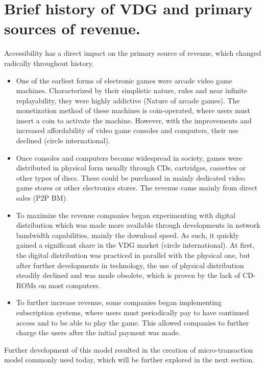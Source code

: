 \documentclass[10pt,british,a4paper,titlepage]{article}
\begin{document}
\section{Brief history of VDG and primary sources of revenue.}

Accessibility has a direct impact on the primary source of revenue, which changed radically throughout history.
 
\begin{itemize}

\item One of the earliest forms of electronic games were arcade video game machines. Characterized by their simplistic nature, rules and near infinite replayability, they were highly addictive (Nature of arcade games). The monetization method of these machines is coin-operated, where users must insert a coin to activate the machine. However, with the improvements and increased affordability of video game consoles and computers, their use declined (circle international).

\item Once consoles and computers became widespread in society, games were distributed in physical form usually through CDs, cartridges, cassettes or other types of discs. These could be purchased in mainly dedicated video game stores  or other electronics stores. The revenue came mainly from direct sales (P2P BM).

\item To maximize the revenue companies began experimenting with digital distribution which was made more available through developments in network bandwidth capabilities, mainly the download speed. As such, it quickly gained a significant share in the VDG market (circle international). At first, the digital distribution was practiced in parallel with the physical one, but after further developments in technology, the use of physical distribution steadily declined and was made obsolete, which is proven by the lack of CD-ROMs on most computers.

\item To further increase revenue, some companies began implementing subscription systems, where users must periodically pay to have continued access and to be able to play the game. This allowed companies to further charge the users after the initial payment was made. 

\end{itemize}
Further development of this model resulted in the creation of micro-transaction model commonly used today, which will be further explored in the next section.
\end{document}
